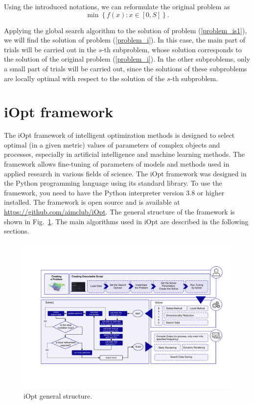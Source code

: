 \documentclass[preprint,12pt]{elsarticle}
\begin{document}
Using the introduced notations, we can reformulate the original problem as
\begin{equation}\label{problem_is1}
\min \left\{f(x): x \in [0,S] \right\}.
\end{equation}

Applying the global search algorithm to the solution of problem (\ref{problem_is1}), we will find the solution of problem (\ref{problem_i}). In this case, the main part of trials will be carried out in the $s$-th subproblem, whose solution corresponds to the solution of the original problem (\ref{problem_i}). In the other subproblems, only a small part of trials will be carried out, since the solutions of these subproblems are locally optimal with respect to the solution of the $s$-th subproblem.

\section{iOpt framework} 
\label{sec_iOpt}

The iOpt framework of intelligent optimization methods is designed to select optimal (in a given metric) values of parameters of complex objects and processes, especially in artificial intelligence and machine learning methods. The framework allows fine-tuning of parameters of models and methods used in applied research in various fields of science.  The iOpt framework was designed in the Python programming language using its standard library. To use the framework, you need to have the Python interpreter version 3.8 or higher installed. The framework is open source and is available at \url{https://github.com/aimclub/iOpt}.
The general structure of the framework is shown in Fig.~\ref{fig_iOpt}. The main algorithms used in iOpt are described in the following sections.

\begin{figure}[t]
\centering
\includegraphics[width=1.0\textwidth]{scheme.pdf}
\caption{iOpt general structure.} \label{fig_iOpt}
\end{figure}
\end{document}
